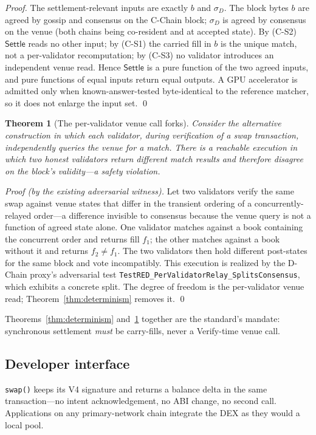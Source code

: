 \documentclass[11pt,a4paper]{article}
\newtheorem{theorem}{Theorem}[section]
\begin{document}
\begin{proof}
The settlement-relevant inputs are exactly $b$ and $\sigma_D$. The block bytes $b$ are agreed by
gossip and consensus on the C-Chain block; $\sigma_D$ is agreed by consensus on the venue (both
chains being co-resident and at accepted state). By (C-S2) $\mathsf{Settle}$ reads no other input;
by (C-S1) the carried fill in $b$ is the unique match, not a per-validator recomputation; by (C-S3)
no validator introduces an independent venue read. Hence $\mathsf{Settle}$ is a pure function of
the two agreed inputs, and pure functions of equal inputs return equal outputs. A GPU accelerator
is admitted only when known-answer-tested byte-identical to the reference matcher, so it does not
enlarge the input set. \qed
\end{proof}

\begin{theorem}[The per-validator venue call forks]\label{thm:fork}
Consider the alternative construction in which each validator, during verification of a swap
transaction, independently queries the venue for a match. There is a reachable execution in which
two honest validators return different match results and therefore disagree on the block's
validity---a safety violation.
\end{theorem}

\begin{proof}[Proof (by the existing adversarial witness)]
Let two validators verify the same swap against venue states that differ in the transient ordering
of a concurrently-relayed order---a difference invisible to consensus because the venue query is
not a function of agreed state alone. One validator matches against a book containing the
concurrent order and returns fill $f_1$; the other matches against a book without it and returns
$f_2 \neq f_1$. The two validators then hold different post-states for the same block and vote
incompatibly. This execution is realized by the D-Chain proxy's adversarial test
\texttt{TestRED\_PerValidatorRelay\_SplitsConsensus}, which exhibits a concrete split. The degree
of freedom is the per-validator venue read; Theorem~\ref{thm:determinism} removes it. \qed
\end{proof}

Theorems~\ref{thm:determinism} and~\ref{thm:fork} together are the standard's mandate: synchronous
settlement \emph{must} be carry-fills, never a Verify-time venue call.

\subsection{Developer interface}
\texttt{swap()} keeps its V4 signature and returns a balance delta in the same transaction---no
intent acknowledgement, no ABI change, no second call. Applications on any primary-network chain
integrate the DEX as they would a local pool.
\end{document}
